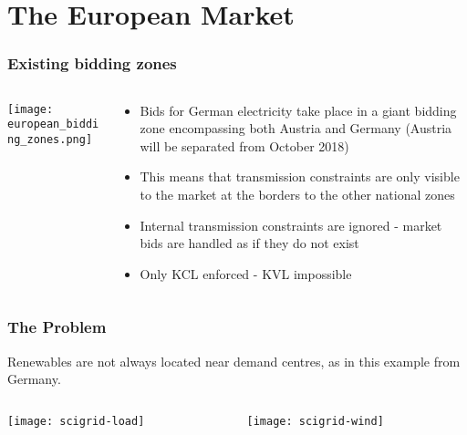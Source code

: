 \documentclass[10pt,dvipsnames]{beamer}
\let\olditem\item
\renewcommand{\item}{%
\olditem\vspace{5pt}}
\begin{document}
\section{The European Market}


\begin{frame}
  \frametitle{Existing bidding zones}



\begin{columns}[T]
  \begin{column}{5cm}

    \vspace{.5cm}
    \texttt{[image: european\_bidding\_zones.png]}
  \end{column}

  \begin{column}{6cm}

    \begin{itemize}
    \item Bids for German electricity take place in a \alert{giant bidding zone} encompassing both Austria and Germany (Austria will be separated from October 2018)
    \item This means that transmission constraints are only visible to the market at the \alert{borders} to the other national zones
    \item Internal transmission constraints are \alert{ignored} - market bids are handled as if they do not exist
    \item Only KCL enforced - KVL impossible
    \end{itemize}

\end{column}
\end{columns}


\end{frame}


\begin{frame}
  \frametitle{The Problem}

  Renewables are not always located near demand centres, as in this example from Germany.



\begin{columns}[T]
  \begin{column}{6cm}
\texttt{[image: scigrid-load]}
  \end{column}

  \begin{column}{6cm}
  \texttt{[image: scigrid-wind]}


\end{column}
\end{columns}

\end{frame}
\end{document}
